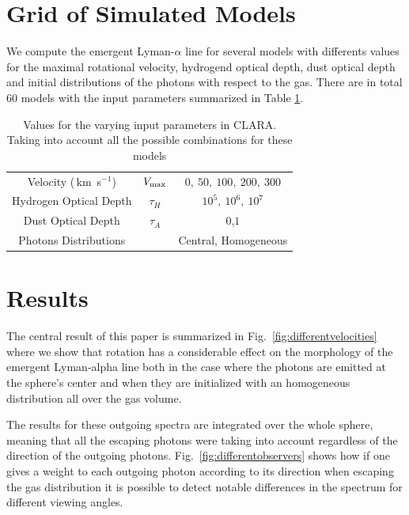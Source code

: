 \documentclass[usenatbib]{mn2e}
\newcommand{\kms}{\,km~s$^{-1}$}
\begin{document}
\section{Grid of Simulated Models}
\label{sec:models}

We compute the emergent Lyman-$\alpha$ line for several models with
differents values for the maximal rotational velocity, hydrogend optical
depth, dust optical depth and initial distributions of the photons
with respect to the gas. There are in total 60 models with the input
parameters summarized in Table  \ref{table:models}. 

\begin{table}
\begin{center}
\begin{tabular}{ccc}\hline
Velocity (\kms) & $V_{\rm max}$&$0,\ 50,\ 100,\ 200,\ 300$\\
Hydrogen Optical Depth & $\tau_{H} $ & $10^{5},\ 10^{6},\ 10^{7}$\\
Dust Optical Depth & $\tau_{A}$ & $0$,$1$\\
Photons Distributions & & Central, Homogeneous\\
\hline
\end{tabular}
\caption{
Values for the varying input parameters in CLARA. Taking into account
all the possible combinations for these models
} 
\label{table:models}
\end{center}
\end{table}







\section{Results}
\label{sec:results}

The central result of this paper is summarized in
Fig.~\ref{fig:differentvelocities} where we show that rotation has a
considerable effect on the morphology of the emergent Lyman-alpha line
both in the case where the photons are emitted at the sphere's center
and when they are initialized with an homogeneous distribution all
over the gas volume.

The results for these outgoing spectra are integrated over the whole
sphere, meaning that all the escaping photons were taking into account
regardless of the direction of the outgoing photons. Fig.~\ref{fig:differentobservers}
shows how if one gives a weight to each outgoing
photon according to its direction when escaping the gas distribution
it is possible to detect notable differences in the spectrum for
different viewing angles.
\end{document}
